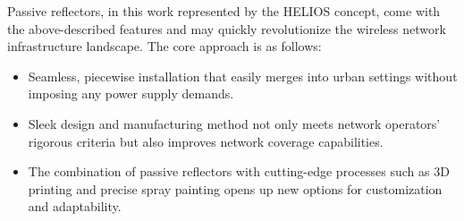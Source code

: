 Passive reflectors, in this work represented by the HELIOS \cite{Helios} concept, come with the above-described features and may quickly revolutionize the wireless network infrastructure landscape. The core approach is as follows:
\begin{itemize}
	\item Seamless, piecewise installation that easily merges into urban settings without imposing any power supply demands.
	\item Sleek design and manufacturing method not only meets network operators’
	rigorous criteria but also improves network coverage capabilities.
	\item The combination of passive reflectors with cutting-edge processes such as 3D printing and precise spray painting opens up new options for customization and adaptability.
\end{itemize}
